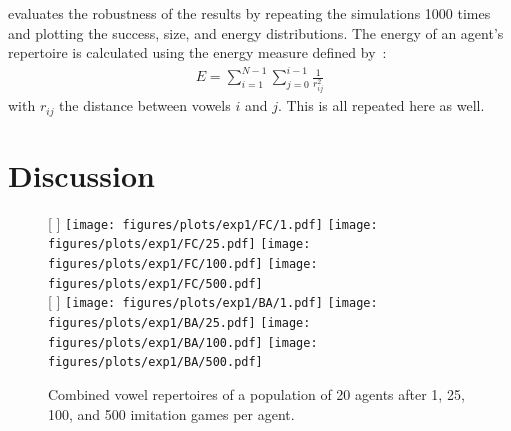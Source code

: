 \documentclass[11pt]{article}
\begin{document}
 evaluates the robustness of
the results by repeating the simulations 1000 times and plotting the success, size, and energy distributions.
The energy of an agent's repertoire is calculated using the energy measure defined by~:
\begin{align}
    \label{form:energy}
    E = \sum^{N-1}_{i=1}\sum^{i-1}_{j=0} \frac{1}{r_{ij}^2}
\end{align}
with $r_{ij}$ the distance between vowels $i$ and $j$.
This is all repeated here as well.

\section{Discussion\label{sec:discus}}

\begin{figure}[t]
    \centering
    [%
        \textwidth %
    ]%
    {%
        \texttt{[image: figures/plots/exp1/FC/1.pdf]}
        \texttt{[image: figures/plots/exp1/FC/25.pdf]}
        \texttt{[image: figures/plots/exp1/FC/100.pdf]}
        \texttt{[image: figures/plots/exp1/FC/500.pdf]}
    }%
    \\\bigskip
    [%
        \textwidth %
    ]%
    {%
        \texttt{[image: figures/plots/exp1/BA/1.pdf]}
        \texttt{[image: figures/plots/exp1/BA/25.pdf]}
        \texttt{[image: figures/plots/exp1/BA/100.pdf]}
        \texttt{[image: figures/plots/exp1/BA/500.pdf]}
    }%
    \caption{Combined vowel repertoires of a population of 20 agents after 1, 25, 100, and 500
        imitation games per agent.}
    \label{fig:res}
\end{figure}
\end{document}
